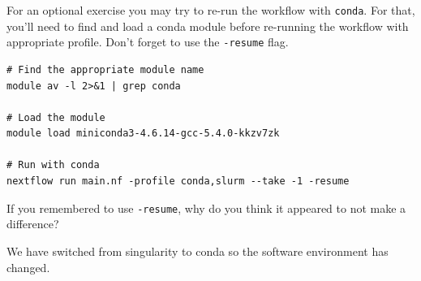 \begin{bonus}
For an optional exercise you may try to re-run the workflow with \texttt{conda}.
For that, you'll need to find and load a conda module before re-running the workflow with appropriate profile. Don't forget to use the \texttt{-resume} flag.
\begin{answer}
\begin{lstlisting}
# Find the appropriate module name
module av -l 2>&1 | grep conda

# Load the module
module load miniconda3-4.6.14-gcc-5.4.0-kkzv7zk

# Run with conda
nextflow run main.nf -profile conda,slurm --take -1 -resume

\end{lstlisting}
\end{answer}

If you remembered to use \texttt{-resume}, why do you think it appeared to not make a difference?

\begin{answer}
We have switched from singularity to conda so the software environment has changed.  
\end{answer}


\end{bonus}




%
%
%
%
%
%



